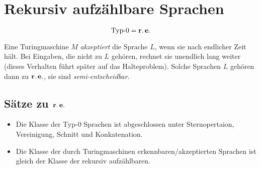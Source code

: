 \chapter{Rekursiv aufzählbare Sprachen}\label{sec:typ0}
\begin{equation*}
	\operatorname{Typ-0} = \operatorname{\mathbf{r.e.}}
\end{equation*}



Eine Turingmaschine $M$ \emph{akzeptiert} die Sprache $L$, wenn sie nach endlicher Zeit hält.
Bei Eingaben, die nicht zu $L$ gehören, rechnet sie unendlich lang weiter (dieses Verhalten führt später auf das Halteproblem).
Solche Sprachen $L$ gehören dann zu $\operatorname{\mathbf{r.e.}}$, sie sind \emph{semi-entscheidbar}.



\section{Sätze zu $\operatorname{\mathbf{r.e.}}$}
\begin{itemize}
	\item Die Klasse der Typ-0 Sprachen ist abgeschlossen unter Sternopertaion, Vereinigung, Schnitt und Konkatenation.
	\item Die Klasse der durch Turingmaschinen erkennbaren/akzeptierten Sprachen ist gleich der Klasse der rekursiv aufzählbaren.
\end{itemize}
